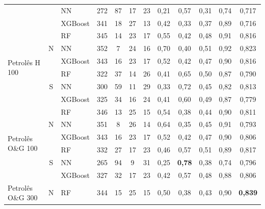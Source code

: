 \documentclass[conference]{IEEEtran}
\begin{document}
\begin{table}[t]
\begin{tabular}{lclccccccccc}
                                   &                    & NN      & 272 & 87 & 17 & 23 & 0,21 & 0,57 & 0,31  & 0,74    & 0,717    \\ \cline{3-12} 
                                   &                    & XGBoost & 341 & 18 & 27 & 13 & 0,42 & 0,33 & 0,37  & 0,89    & 0,716    \\ \hline
\multirow{6}{*}{Petrolês H 100}    & \multirow{3}{*}{N} & RF      & 345 & 14 & 23 & 17 & 0,55 & 0,42 & 0,48  & 0,91    & 0,816    \\ \cline{3-12} 
                                   &                    & NN      & 352 & 7  & 24 & 16 & 0,70& 0,40& 0,51  & 0,92    & 0,823    \\ \cline{3-12} 
                                   &                    & XGBoost & 343 & 16 & 23 & 17 & 0,52 & 0,42 & 0,47  & 0,90& 0,816    \\ \cline{2-12} 
                                   & \multirow{3}{*}{S} & RF      & 322 & 37 & 14 & 26 & 0,41 & 0,65 & 0,50& 0,87    & 0,790\\ \cline{3-12} 
                                   &                    & NN      & 300 & 59 & 11 & 29 & 0,33 & 0,72 & 0,45  & 0,82    & 0,813    \\ \cline{3-12} 
                                   &                    & XGBoost & 325 & 34 & 16 & 24 & 0,41 & 0,60& 0,49  & 0,87    & 0,779    \\ \hline
\multirow{6}{*}{Petrolês O\&G 100} & \multirow{3}{*}{N} & RF      & 346 & 13 & 25 & 15 & 0,54 & 0,38 & 0,44  & 0,90& 0,811    \\ \cline{3-12} 
                                   &                    & NN      & 351 & 8  & 26 & 14 & 0,64 & 0,35 & 0,45  & 0,91    & 0,793    \\ \cline{3-12} 
                                   &                    & XGBoost & 343 & 16 & 23 & 17 & 0,52 & 0,42 & 0,47  & 0,90& 0,806    \\ \cline{2-12} 
                                   & \multirow{3}{*}{S} & RF      & 332 & 27 & 17 & 23 & 0,46 & 0,57 & 0,51  & 0,89    & 0,817    \\ \cline{3-12} 
                                   &                    & NN      & 265 & 94 & 9  & 31 & 0,25 & \textbf{0,78} & 0,38  & 0,74    & 0,796    \\ \cline{3-12} 
                                   &                    & XGBoost & 327 & 32 & 17 & 23 & 0,42 & 0,57 & 0,48  & 0,88    & 0,806    \\ \hline
\multirow{6}{*}{Petrolês O\&G 300} & \multirow{3}{*}{N} & RF      & 344 & 15 & 25 & 15 & 0,50& 0,38 & 0,43  & 0,90& \textbf{0,839}    \\ \cline{3-12} 

\end{tabular}
\end{table}
\end{document}
